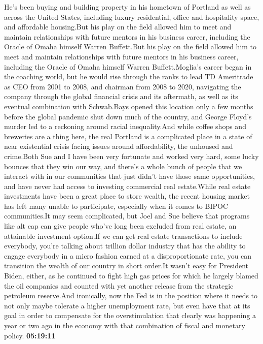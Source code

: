 \documentclass{article}%
\begin{document}
He's been buying and building property in his hometown of Portland as well as across the United States, including luxury residential, office and hospitality space, and affordable housing.But his play on the field allowed him to meet and maintain relationships with future mentors in his business career, including the Oracle of Omaha himself Warren Buffett.But his play on the field allowed him to meet and maintain relationships with future mentors in his business career, including the Oracle of Omaha himself Warren Buffett.Moglia's career began in the coaching world, but he would rise through the ranks to lead TD Ameritrade as CEO from 2001 to 2008, and chairman from 2008 to 2020, navigating the company through the global financial crisis and its aftermath, as well as its eventual combination with Schwab.Bays opened this location only a few months before the global pandemic shut down much of the country, and George Floyd's murder led to a reckoning around racial inequality.And while coffee shops and breweries are a thing here, the real Portland is a complicated place in a state of near existential crisis facing issues around affordability, the unhoused and crime.Both Sue and I have been very fortunate and worked very hard, some lucky bounces that they win our way, and there's a whole bunch of people that we interact with in our communities that just didn't have those same opportunities, and have never had access to investing commercial real estate.While real estate investments have been a great place to store wealth, the recent housing market has left many unable to participate, especially when it comes to BIPOC communities.It may seem complicated, but Joel and Sue believe that programs like alt cap can give people who've long been excluded from real estate, an attainable investment option.If we can get real estate transactions to include everybody, you're talking about trillion dollar industry that has the ability to engage everybody in a micro fashion earned at a disproportionate rate, you can transition the wealth of our country in short order.It wasn't easy for President Biden, either, as he continued to fight high gas prices for which he largely blamed the oil companies and counted with yet another release from the strategic petroleum reserve.And ironically, now the Fed is in the position where it needs to not only maybe tolerate a higher unemployment rate, but even have that at its goal in order to compensate for the overstimulation that clearly was happening a year or two ago in the economy with that combination of fiscal and monetary policy.%
\textbf{05:19:11}%
\end{document}
